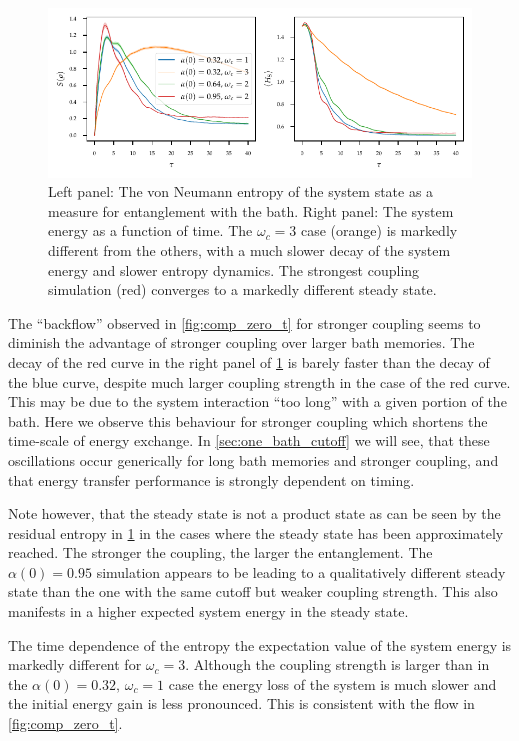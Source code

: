 \begin{figure}[h]
  \centering
  \includegraphics{figs/analytic_comp/entropy_zero.pdf}
  \caption{\label{fig:ho_zero_entropy} Left panel: The von Neumann
    entropy of the system state as a measure for entanglement with the
    bath. Right panel: The system energy as a function of time. The
    \(ω_{c}=3\) case (orange) is markedly different from the others,
    with a much slower decay of the system energy and slower entropy
    dynamics. The strongest coupling simulation (red) converges to a
    markedly different steady state.}
\end{figure}
The ``backflow'' observed in \cref{fig:comp_zero_t} for stronger
coupling seems to diminish the advantage of stronger coupling over
larger bath memories. The decay of the red curve in the right panel of
\cref{fig:ho_zero_entropy} is barely faster than the decay of the blue
curve, despite much larger coupling strength in the case of the red
curve. This may be due to the system interaction ``too long'' with a
given portion of the bath. Here we observe this behaviour for stronger
coupling which shortens the time-scale of energy exchange. In
\cref{sec:one_bath_cutoff} we will see, that these oscillations occur
generically for long bath memories and stronger coupling, and that
energy transfer performance is strongly dependent on timing.

Note however, that the steady state is not a product state as can be
seen by the residual entropy in \cref{fig:ho_zero_entropy} in the
cases where the steady state has been approximately reached. The
stronger the coupling, the larger the entanglement. The \(α(0)=0.95\)
simulation appears to be leading to a qualitatively different steady
state than the one with the same cutoff but weaker coupling
strength. This also manifests in a higher expected system energy in
the steady state.

The time dependence of the entropy the expectation value of the system
energy is markedly different for \(ω_c=3\). Although the coupling
strength is larger than in the \(α(0)=0.32,\, ω_c=1\) case the energy
loss of the system is much slower and the initial energy gain is
less pronounced. This is consistent with the flow in
\cref{fig:comp_zero_t}.

